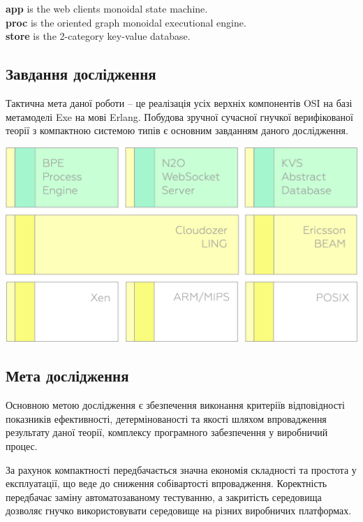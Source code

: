 \documentclass[11pt,oneside]{article}
\begin{document}
{\bf app} is the web clients monoidal state machine.\\
{\bf proc} is the oriented graph monoidal executional engine.\\
{\bf store} is the 2-category key-value database.\\

\newpage
\subsection{Завдання дослідження}
\vspace{0.5cm}
   Тактична мета даної роботи -- це
   реалізація усіх верхніх компонентів OSI на базі метамоделі Exe на мові Erlang.
   Побудова зручної сучасної гнучкої верифікованої теорії
   з компактною системою типів є основним завданням даного дослідження.

   \begin{center}
   \vspace{1cm}
   \includegraphics[scale=0.15]{img/exe-res}
   \end{center}

\newpage
\subsection{Мета дослідження}
\vspace{0.5cm}
   Основною метою дослідження є збезпечення виконання критеріїв відповідності
   показників ефективності, детермінованості та якості шляхом впровадження
   результату даної теорії, комплексу програмного забезпечення у виробничий процес.

   За рахунок компактності передбачається значна економія складності та простота у експлуатації,
   що веде до сниження собівартості впровадження. Коректність передбачає заміну
   автоматозаваному тестуванню, а закритість середовища дозволяє гнучко використовувати
   середовище на різних виробничих платформах.
   \\
\end{document}
